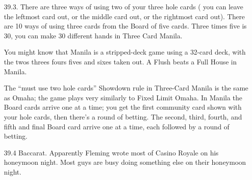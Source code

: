 39.3. There are three ways of using two of your three hole
cards ( you can leave the leftmost card out, or the middle card out,
or the rightmost card out). There are 10 ways of using three cards
from the Board of five cards. Three times five is 30, you can make 30
different hands in Three Card Manila.

You might know that Manila is a stripped-deck game using a 32-card
deck, with the twos threes fours fives and sixes taken out. A Flush
beats a Full House in Manila.

The ``must use two hole cards'' Showdown rule in Three-Card Manila is
the same as Omaha; the game plays very similarly to Fixed Limit
Omaha. In Manila the Board cards arrive one at a time; you get the
first community card shown with your hole cards, then there's a round
of betting. The second, third, fourth, and fifth and final Board card
arrive one at a time, each followed by a round of betting.

39.4 Baccarat. Apparently Fleming wrote most of Casino Royale
on his honeymoon night. Most guys are busy doing something else
on their honeymoon night.
